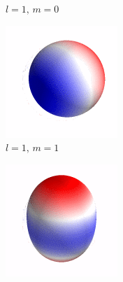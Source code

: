 \begin{figure}[ht]
\begin{subfigure}[b]{0.2\linewidth}
        \caption*{$l=1,\,m=0$}
    \end{subfigure}%
    \begin{subfigure}[b]{0.2\linewidth}
        \includegraphics[width=\linewidth]{introduction/images/1_1.png}
        \caption*{$l=1,\,m=1$}
    \end{subfigure}%
    \begin{subfigure}[b]{0.2\linewidth}
        \includegraphics[width=\linewidth]{introduction/images/2_0.png}

\end{subfigure}
\end{figure}
